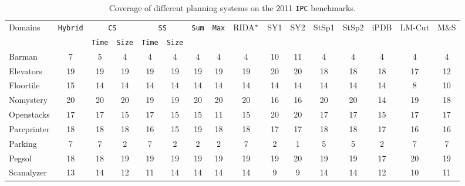 \begin{table}[htb]
\tiny
\setlength{\tabcolsep}{1.8pt}
\centering
\caption{Coverage of different planning systems on the 2011 \texttt{IPC} benchmarks. %
}
\begin{tabular}{lccccccccccccccc}
\hline
\multirow{2}{*}{Domains} & 
\multirow{2}{*}{\texttt{Hybrid}} & 
\multicolumn{2}{c}{\texttt{CS}} & 
\multicolumn{2}{c}{\texttt{SS}} & 
\multirow{2}{*}{\texttt{Sum}} & 
\multirow{2}{*}{\texttt{Max}} &
\multirow{2}{*}{RIDA$\sp{*}$} & 
\multirow{2}{*}{SY1} & 
\multirow{2}{*}{SY2} & 
\multirow{2}{*}{StSp1} & 
\multirow{2}{*}{StSp2} & 
\multirow{2}{*}{iPDB} & 
\multirow{2}{*}{LM-Cut} & 
\multirow{2}{*}{M$\&$S} \\ \cline{3-6}
                         &                                    & \texttt{Time} & \texttt{Size} & \texttt{Time} & \texttt{Size} &                                 &                       &                      &                      &                        &                        &                                 &                       &                         &                         \\ \hline
Barman&         7&      5&     4&    4&    4&    4&   4&    4&    10&  11&    4&    4&    4&     4&   4\\
Elevators&     19&     19&    19&   19&   19&   19&  19&   19&    20&  20&   18&   18&   18&    17&  12\\
Floortile&     15&     14&    14&   14&   14&   14&  14&   14&    14&  14&   14&   14&   14&     8&  10\\
Nomystery&     20&     20&    20&   19&   19&   20&  20&   20&    16&  16&   20&   20&   14&    19&  18\\
Openstacks&    17&     17&    15&   17&   15&   15&  11&   15&    20&  20&   17&   17&   15&    17&  17\\
Parcprinter&   18&     18&    18&   16&   15&   19&  18&   18&    17&  17&   18&   18&   17&    16&  16\\
Parking&        7&      7&     2&    7&    2&    2&   2&    7&     2&   1&    5&    5&    2&     7&   7\\
Pegsol&        18&     18&    19&   19&   19&   19&  19&   19&    19&  20&   19&   19&   17&    20&  19\\
Scanalyzer&    13&     14&    12&   11&   14&   14&  14&   14&     9&   9&   14&   14&   12&    10&  11\\

\end{tabular}
\end{table}
